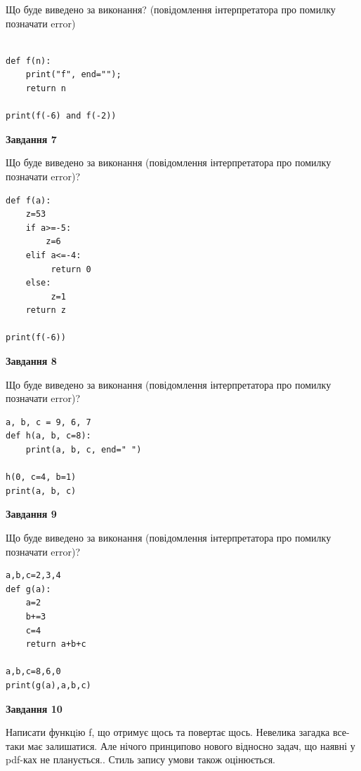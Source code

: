 \documentclass[12pt, ukrainian]{article}
\begin{document}
{\begin {large}
Що буде виведено за виконання? (повідомлення інтерпретатора про помилку позначати error)\par
\begin{verbatim}

def f(n):
    print("f", end="");
    return n

print(f(-6) and f(-2))
\end{verbatim}

{\begin {center}\textbf{Завдання 7}\end {center}}

Що буде виведено за виконання (повідомлення інтерпретатора про помилку позначати error)?\par
\begin{verbatim}
def f(a):
    z=53
    if a>=-5: 
        z=6
    elif a<=-4:
         return 0
    else:
         z=1
    return z

print(f(-6))
\end{verbatim}

{\begin {center}\textbf{Завдання 8}\end {center}}

Що буде виведено за виконання (повідомлення інтерпретатора про помилку позначати error)?\par
\begin{verbatim}
a, b, c = 9, 6, 7
def h(a, b, c=8):
    print(a, b, c, end=" ")

h(0, c=4, b=1)
print(a, b, c)
\end{verbatim}

{\begin {center}\textbf{Завдання 9}\end {center}}

Що буде виведено за виконання (повідомлення інтерпретатора про помилку позначати error)?\par
\begin{verbatim}
a,b,c=2,3,4
def g(a):
    a=2
    b+=3
    c=4
    return a+b+c

a,b,c=8,6,0
print(g(a),a,b,c)
\end{verbatim}

{\begin {center}\textbf{Завдання 10}\end {center}}


Написати функцiю f, що отримує щось та повертає щось. Невелика загадка все-таки має залишатися. Але нічого принципово нового відносно задач, що наявні у pdf-ках не планується.. Стиль запису умови також оцінюється.\par
\end {large}}
\newpage
\end{document}
